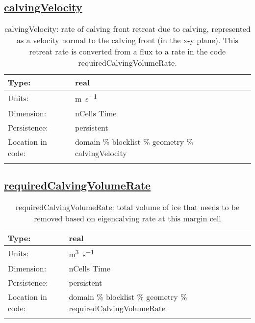 \subsection[calvingVelocity]{\hyperref[sec:var_tab_geometry]{calvingVelocity}}
\label{subsec:var_sec_geometry_calvingVelocity}
\begin{center}
\begin{longtable}{| p{2.0in} | p{4.0in} |}
        \hline 
        Type: & real \\
        \hline 
        Units: & \si{m.s^{-1}} \\
        \hline 
        Dimension: & nCells Time \\
        \hline 
        Persistence: & persistent \\
        \hline 
         Location in code: & domain \% blocklist \% geometry \% calvingVelocity \\
         \hline 
    \caption{calvingVelocity: rate of calving front retreat due to calving, represented as a velocity normal to the calving front (in the x-y plane).  This retreat rate is converted from a flux to a rate in the code requiredCalvingVolumeRate.}
\end{longtable}
\end{center}
\subsection[requiredCalvingVolumeRate]{\hyperref[sec:var_tab_geometry]{requiredCalvingVolumeRate}}
\label{subsec:var_sec_geometry_requiredCalvingVolumeRate}
\begin{center}
\begin{longtable}{| p{2.0in} | p{4.0in} |}
        \hline 
        Type: & real \\
        \hline 
        Units: & \si{m^3.s^{-1}} \\
        \hline 
        Dimension: & nCells Time \\
        \hline 
        Persistence: & persistent \\
        \hline 
         Location in code: & domain \% blocklist \% geometry \% requiredCalvingVolumeRate \\
         \hline 
    \caption{requiredCalvingVolumeRate: total volume of ice that needs to be removed based on eigencalving rate at this margin cell}
\end{longtable}
\end{center}
